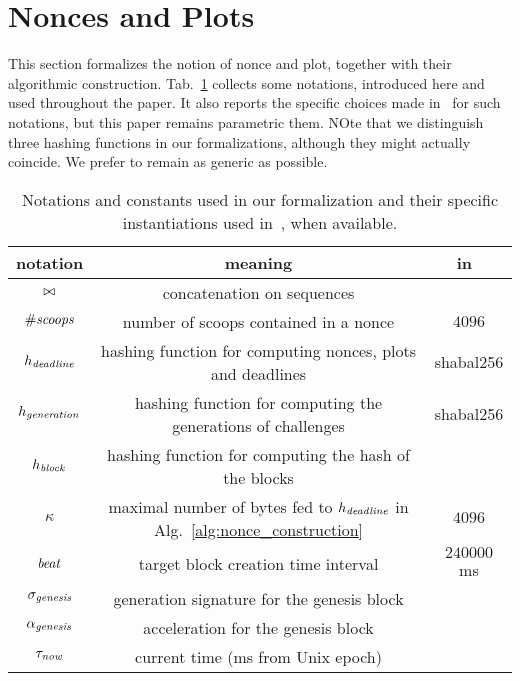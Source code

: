 \section{Nonces and Plots}\label{sec:nonces_and_plots}

This section formalizes the notion of nonce and plot, together with their
algorithmic construction. Tab.~\ref{tab:notations} collects some notations,
introduced here and used throughout the paper.
It also reports the specific choices
made in~\cite{SignumPlotting} for such notations, but this paper remains parametric \wrt them.
NOte that we distinguish three hashing functions in our formalizations, although they
might actually coincide. We prefer to remain as generic as possible.

\begin{table}[t]
\begin{center}
\begin{tabular}{|c|c|c|}
  \hline
  \textbf{notation} & \textbf{meaning} & \textbf{in~\cite{SignumPlotting}}\\\hline\hline

  $\operatorname*{\bowtie}$ & concatenation on sequences & \\\hline
  ${\#\mathit{scoops}}$ & number of scoops contained in a nonce & $4096$\\\hline

  $h_{\mathit{deadline}}$ & hashing function for computing nonces, plots and deadlines & shabal256\\\hline

  $h_{\mathit{generation}}$ & hashing function for computing the generations of challenges & shabal256\\\hline

  $h_{\mathit{block}}$ & hashing function for computing the hash of the blocks & \\\hline

  $\kappa$ & maximal number of bytes fed to $h_{\mathit{deadline}}$ in Alg.~\ref{alg:nonce_construction} & $4096$\\\hline

  ${\mathit{beat}}$ & target block creation time interval & $240000$ ms\\\hline
  $\sigma_{\mathit{genesis}}$ & generation signature for the genesis block & \\\hline

  $\alpha_{\mathit{genesis}}$ & acceleration for the genesis block & \\\hline

  $\tau_{\mathit{now}}$ & current time (ms from Unix epoch) & \\\hline
\end{tabular}
\end{center}
\caption{Notations and constants used in our formalization and their specific instantiations
  used in~\cite{SignumPlotting}, when available.}
\label{tab:notations}
\end{table}
